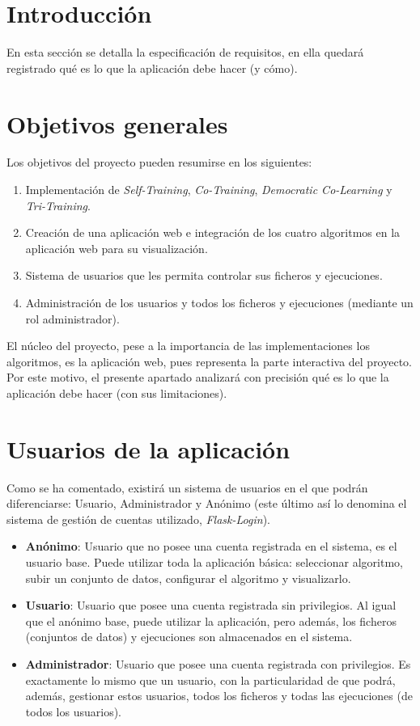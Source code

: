 
\section{Introducción}

En esta sección se detalla la especificación de requisitos, en ella quedará
registrado qué es lo que la aplicación debe hacer (y cómo).

\section{Objetivos generales}
Los objetivos del proyecto pueden resumirse en los siguientes:
\begin{enumerate}
    \item Implementación de \textit{Self-Training}, \textit{Co-Training},
    \textit{Democratic Co-Learning} y \textit{Tri-Training}.
    \item Creación de una aplicación web e integración de los cuatro algoritmos
    en la aplicación web para su visualización.
    \item Sistema de usuarios que les permita controlar sus ficheros y
    ejecuciones.
    \item Administración de los usuarios y todos los ficheros y ejecuciones
    (mediante un rol administrador).
\end{enumerate}

El núcleo del proyecto, pese a la importancia de las implementaciones los
algoritmos, es la aplicación web, pues representa la parte interactiva del
proyecto. Por este motivo, el presente apartado analizará con precisión qué es
lo que la aplicación debe hacer (con sus limitaciones).

\section{Usuarios de la aplicación}

Como se ha comentado, existirá un sistema de usuarios en el que podrán
diferenciarse: Usuario, Administrador y Anónimo (este último así lo denomina el
sistema de gestión de cuentas utilizado, \textit{Flask-Login}). 

\begin{itemize}
	\item \textbf{Anónimo}: Usuario que no posee una cuenta registrada en el sistema, es
	el usuario base. Puede utilizar toda la aplicación básica: seleccionar
	algoritmo, subir un conjunto de datos, configurar el algoritmo y
	visualizarlo.
	\item \textbf{Usuario}: Usuario que posee una cuenta registrada sin privilegios. Al
	igual que el anónimo base, puede utilizar la aplicación, pero además, los
	ficheros (conjuntos de datos) y ejecuciones son almacenados en el sistema.
	\item \textbf{Administrador}: Usuario que posee una cuenta registrada con
	privilegios. Es exactamente lo mismo que un usuario, con la particularidad
	de que podrá, además, gestionar estos usuarios, todos los ficheros y todas
	las ejecuciones (de todos los usuarios). 
\end{itemize}

